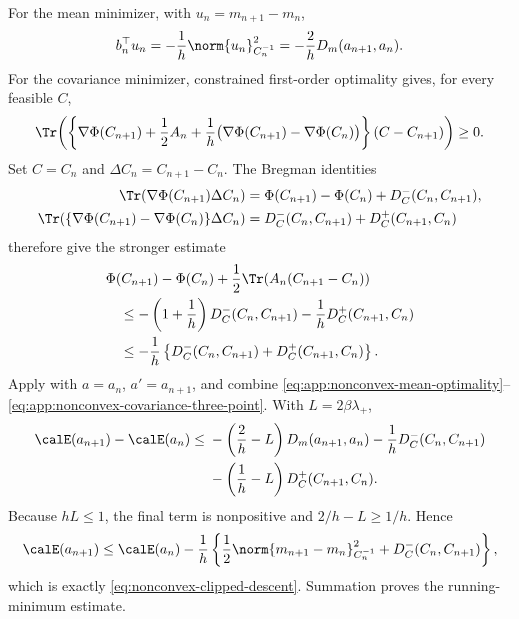 For the mean minimizer, with \(u_n=m_{n+1}-m_n\),
\begin{equation}
  b_n^\top u_n=-\frac1h\norm{u_n}_{C_n^{-1}}^2
  =-\frac2hD_m(a_{n+1},a_n).
  \label{eq:app:nonconvex-mean-optimality}
\end{equation}
For the covariance minimizer, constrained first-order optimality gives, for
every feasible \(C\),
\begin{equation}
  \Tr\!\left(
    \left\{
      \nabla\Phi(C_{n+1})+\frac12A_n
      +\frac1h\bigl(\nabla\Phi(C_{n+1})-\nabla\Phi(C_n)\bigr)
    \right\}(C-C_{n+1})
  \right)\geq0.
  \label{eq:app:nonconvex-covariance-vi}
\end{equation}
Set \(C=C_n\) and \(\Delta C_n=C_{n+1}-C_n\).  The Bregman identities
\begin{align*}
  \Tr\!\left(\nabla\Phi(C_{n+1})\Delta C_n\right)
  &=\Phi(C_{n+1})-\Phi(C_n)+D_C^-(C_n,C_{n+1}),\\
  \Tr\!\left(
    \{\nabla\Phi(C_{n+1})-\nabla\Phi(C_n)\}\Delta C_n
  \right)
  &=D_C^-(C_n,C_{n+1})+D_C^+(C_{n+1},C_n)
\end{align*}
therefore give the stronger estimate
\begin{align}
  &\Phi(C_{n+1})-\Phi(C_n)
   +\frac12\Tr\!\left(A_n(C_{n+1}-C_n)\right)
  \notag\\
  &\quad\leq
  -\left(1+\frac1h\right)D_C^-(C_n,C_{n+1})
  -\frac1hD_C^+(C_{n+1},C_n)
  \notag\\
  &\quad\leq
  -\frac1h\left\{
    D_C^-(C_n,C_{n+1})+D_C^+(C_{n+1},C_n)
  \right\}.
  \label{eq:app:nonconvex-covariance-three-point}
\end{align}
Apply  with
\(a=a_n\), \(a'=a_{n+1}\), and combine
\eqref{eq:app:nonconvex-mean-optimality}--
\eqref{eq:app:nonconvex-covariance-three-point}.  With
\(L=2\beta\lambda_+\),
\begin{align*}
  \calE(a_{n+1})-\calE(a_n)
  \leq{}&
  -\left(\frac2h-L\right)D_m(a_{n+1},a_n)
  -\frac1hD_C^-(C_n,C_{n+1})\\
  &-\left(\frac1h-L\right)D_C^+(C_{n+1},C_n).
\end{align*}
Because \(hL\leq1\), the final term is nonpositive and
\(2/h-L\geq1/h\).  Hence
\[
  \calE(a_{n+1})
  \leq
  \calE(a_n)-\frac1h\left\{
    \frac12\norm{m_{n+1}-m_n}_{C_n^{-1}}^2
    +D_C^-(C_n,C_{n+1})
  \right\},
\]
which is exactly \eqref{eq:nonconvex-clipped-descent}.  Summation proves the
running-minimum estimate.

